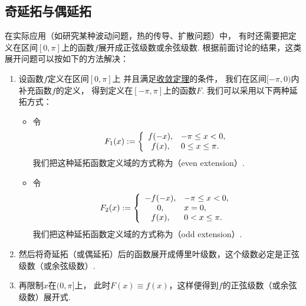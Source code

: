 \subsection{奇延拓与偶延拓}
在实际应用（如研究某种波动问题，热的传导、扩散问题）中，
有时还需要把定义在区间\([0,\pi]\)上的函数\(f\)展开成正弦级数或余弦级数.
根据前面讨论的结果，这类展开问题可以按如下的方法解决：
\begin{enumerate}
	\item 设函数\(f\)定义在区间\([0,\pi]\)上
	并且满足\hyperref[theorem:无穷级数.傅里叶级数收敛的狄利克雷充分条件]{收敛定理}的条件，
	我们在区间\([-\pi,0)\)内补充函数\(f\)的定义，
	得到定义在\([-\pi,\pi]\)上的函数\(F\).
	我们可以采用以下两种延拓方式：
	\begin{itemize}
		\item 令\[
			F_1(x)
			:=
			\left\{ \begin{array}{cl}
				f(-x), & -\pi \leq x < 0, \\
				f(x), & 0 \leq x \leq \pi.
			\end{array} \right.
		\]
		我们把这种延拓函数定义域的方式称为（even extension）.

		\item 令\[
			F_2(x)
			:=
			\left\{ \begin{array}{cl}
				-f(-x), & -\pi \leq x < 0, \\
				0, & x = 0, \\
				f(x), & 0 < x \leq \pi.
			\end{array} \right.
		\]
		我们把这种延拓函数定义域的方式称为（odd extension）.
	\end{itemize}

	\item 然后将奇延拓（或偶延拓）后的函数展开成傅里叶级数，这个级数必定是正弦级数（或余弦级数）.

	\item 再限制\(x\)在\((0,\pi]\)上，
	此时\(F(x)\equiv f(x)\)，这样便得到\(f\)的正弦级数（或余弦级数）展开式.
\end{enumerate}

